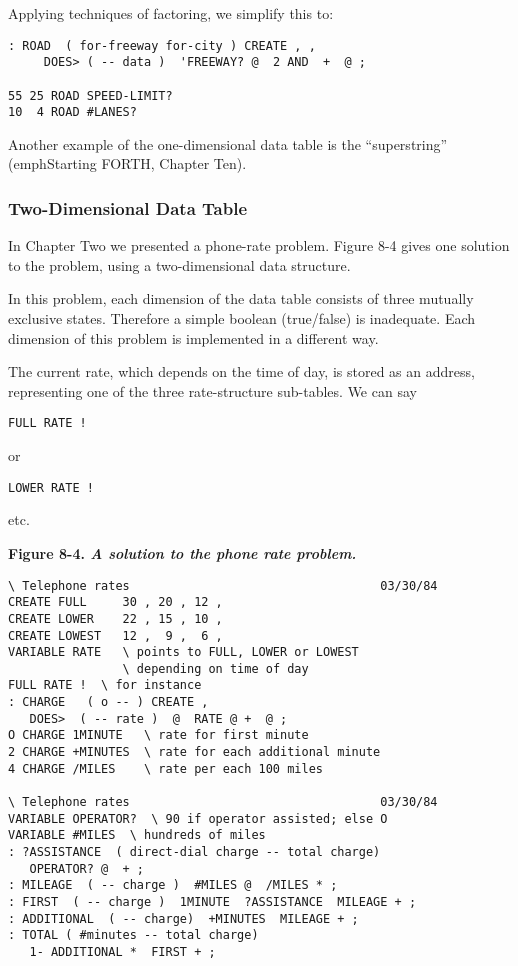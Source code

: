 Applying techniques of factoring, we simplify this to:

\begin{verbatim}
: ROAD  ( for-freeway for-city ) CREATE , ,
     DOES> ( -- data )  'FREEWAY? @  2 AND  +  @ ;

55 25 ROAD SPEED-LIMIT?
10  4 ROAD #LANES?
\end{verbatim}

Another example of the one-dimensional data table is the ``superstring''
(emph{Starting FORTH}, Chapter Ten).

\subsubsection{Two-Dimensional Data Table}

In Chapter Two we presented a phone-rate problem. Figure 8-4 gives one
solution to the problem, using a two-dimensional data structure.

In this problem, each dimension of the data table consists of three
mutually exclusive states. Therefore a simple boolean (true/false) is
inadequate. Each dimension of this problem is implemented in a different
way.

The current rate, which depends on the time of day, is stored as an
address, representing one of the three rate-structure sub-tables. We can
say

\begin{verbatim}
FULL RATE !
\end{verbatim}

or

\begin{verbatim}
LOWER RATE !
\end{verbatim}

etc.

\bf{Figure 8-4.} \emph{A solution to the phone rate problem.}

\begin{verbatim}
\ Telephone rates                                   03/30/84
CREATE FULL     30 , 20 , 12 ,
CREATE LOWER    22 , 15 , 10 ,
CREATE LOWEST   12 ,  9 ,  6 ,
VARIABLE RATE   \ points to FULL, LOWER or LOWEST
                \ depending on time of day
FULL RATE !  \ for instance
: CHARGE   ( o -- ) CREATE ,
   DOES>  ( -- rate )  @  RATE @ +  @ ;
O CHARGE 1MINUTE   \ rate for first minute
2 CHARGE +MINUTES  \ rate for each additional minute
4 CHARGE /MILES    \ rate per each 100 miles

\ Telephone rates                                   03/30/84
VARIABLE OPERATOR?  \ 90 if operator assisted; else O
VARIABLE #MILES  \ hundreds of miles
: ?ASSISTANCE  ( direct-dial charge -- total charge)
   OPERATOR? @  + ;
: MILEAGE  ( -- charge )  #MILES @  /MILES * ;
: FIRST  ( -- charge )  1MINUTE  ?ASSISTANCE  MILEAGE + ;
: ADDITIONAL  ( -- charge)  +MINUTES  MILEAGE + ;
: TOTAL ( #minutes -- total charge)
   1- ADDITIONAL *  FIRST + ;
\end{verbatim}

